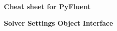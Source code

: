 \documentclass[9pt,landscape]{article}
\begin{document}
\raggedright
\footnotesize


\begin{center}
     \Huge{\textbf{Cheat sheet for PyFluent}} \\
\end{center}
\begin{center}
     \Large{\textbf{Solver Settings Object Interface}} \\
\end{center}

\vspace{-0.15cm}
\noindent\makebox[\linewidth]{\rule{\paperwidth}{2pt}}
\end{document}

